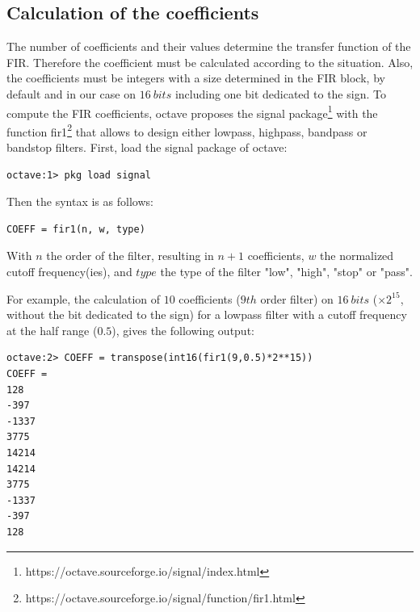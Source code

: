 \documentclass[12pt,oneside]{article}
\begin{document}
\subsection{Calculation of the coefficients}

The number of coefficients and their values determine the transfer function of the FIR. Therefore the coefficient must be calculated according to the situation. Also, the coefficients must be integers with a size determined in the FIR block, by default and in our case on $16~bits$ including one bit dedicated to the sign. 
\newline\newline
To compute the FIR coefficients, octave proposes the signal package\footnote{https://octave.sourceforge.io/signal/index.html} with the function fir1\footnote{https://octave.sourceforge.io/signal/function/fir1.html} that allows to design either lowpass, highpass, bandpass or bandstop filters. First, load the signal package of octave:

\vspace{-0.1cm}
\begin{lstlisting}
octave:1> pkg load signal
\end{lstlisting}
\vspace{+0.5cm}

Then the syntax is as follows:

\vspace{-0.1cm}
\begin{lstlisting}
COEFF = fir1(n, w, type)
\end{lstlisting}
\vspace{+0.5cm}

With $n$ the order of the filter, resulting in $n+1$ coefficients, $w$ the normalized cutoff frequency(ies), and $type$ the type of the filter "low", "high", "stop" or "pass". 

For example, the calculation of $10$ coefficients ($9th$ order filter) on $16~bits$ ($\times 2^{15}$, without the bit dedicated to the sign) for a lowpass filter with a cutoff frequency at the half range ($0.5$), gives the following output: 

\vspace{-0.1cm}
\begin{lstlisting}
octave:2> COEFF = transpose(int16(fir1(9,0.5)*2**15))
COEFF =
128
-397
-1337
3775
14214
14214
3775
-1337
-397
128
\end{lstlisting}
\vspace{+0.5cm}
\end{document}
